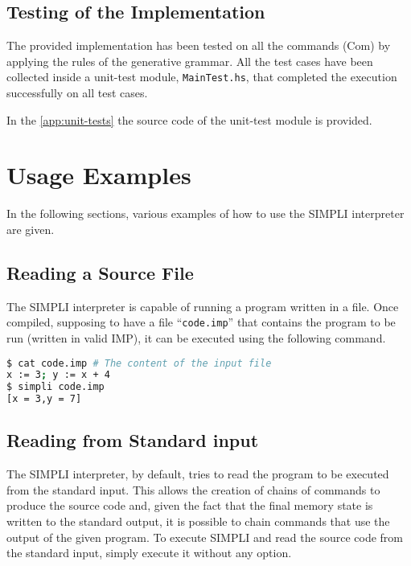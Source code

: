 \documentclass{esposito-documentation}
\begin{document}


\section{Testing of the Implementation}

The provided implementation has been tested on all the commands
($\mathrm{Com}$) by applying the rules of the generative grammar. All the test
cases have been collected inside a unit-test module, \texttt{MainTest.hs}, that
completed the execution successfully on all test cases.

In the \autoref{app:unit-tests} the source code of the unit-test module is
provided.
\chapter{Usage Examples}

In the following sections, various examples of how to use the SIMPLI
interpreter are given.

\section{Reading a Source File}

The SIMPLI interpreter is capable of running a program written in a file. Once
compiled, supposing to have a file ``\texttt{code.imp}'' that contains the
program to be run (written in valid IMP), it can be executed using the
following command.

\begin{lstlisting}[language=sh,numbers=none]
$ cat code.imp # The content of the input file
x := 3; y := x + 4
$ simpli code.imp
[x = 3,y = 7]
\end{lstlisting}

\section{Reading from Standard input}

The SIMPLI interpreter, by default, tries to read the program to be executed
from the standard input. This allows the creation of chains of commands to
produce the source code and, given the fact that the final memory state is
written to the standard output, it is possible to chain commands that use the
output of the given program. To execute SIMPLI and read the source code from
the standard input, simply execute it without any option.
\end{document}
